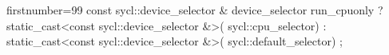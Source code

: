 \begin{cppcode*}{firstnumber=99}
        const sycl::device_selector & device_selector{ 
          run_cpuonly ?
            static_cast<const sycl::device_selector &>(
              sycl::cpu_selector{}) :
            static_cast<const sycl::device_selector &>(
              sycl::default_selector{})
        };
\end{cppcode*}
